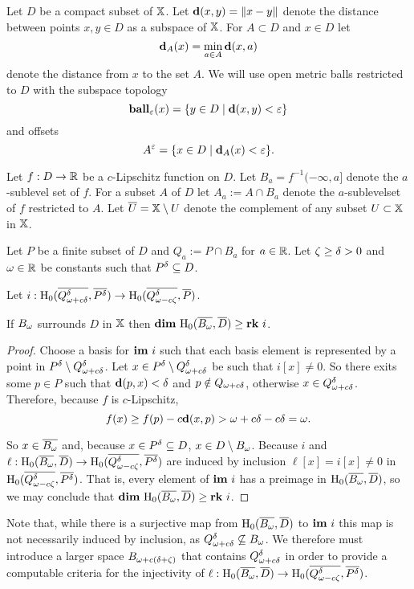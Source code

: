 
Let $D$ be a compact subset of $\mathbb{X}$.
Let $\mathbf{d}(x, y) = \|x - y\|$ denote the distance between points $x,y\in D$ as a subspace of $\mathbb{X}$.
For $A\subset D$ and $x\in D$ let
\[\mathbf{d}_A(x) = \min_{a\in A}\mathbf{d}(x, a)\]
denote the distance from $x$ to the set $A$.
We will use open metric balls restricted to $D$ with the subspace topology
\[\mathbf{ball}_\varepsilon(x) = \{y\in D\mid \mathbf{d}(x, y) < \varepsilon\}\]
and offsets
\[A^\varepsilon = \{x\in D\mid \mathbf{d}_A(x) < \varepsilon\}.\]

Let $f : D\to \mathbb{R}$ be a $c$-Lipschitz function on $D$.
Let $B_a = f^{-1}(-\infty, a]$ denote the $a$-sublevel set of $f$.
For a subset $A$ of $D$ let $A_a := A\cap B_a$ denote the $a$-sublevelset of $f$ restricted to $A$.
Let $\overline{U} = \mathbb{X}\setminus U$ denote the complement of any subset $U\subset \mathbb{X}$ in $\mathbb{X}$.

Let $P$ be a finite subset of $D$ and $Q_a := P\cap B_a$ for $a\in\mathbb{R}$.
Let $\zeta\geq{\delta} > 0 $ and $\omega\in \mathbb{R}$ be constants such that $P^{\delta}\subseteq D$.

\begin{lemma}\label{lem:psurj}
  Let $i : \mathrm{H}_0(\overline{Q_{\omega + c{\delta}}^{\delta}}, \overline{P^{\delta}})\to \mathrm{H}_0(\overline{Q_{\omega - c\zeta}^{\delta}}, \overline{P})$.

  If $B_{\omega}$ surrounds $D$ in $\mathbb{X}$ then $\mathbf{dim}~\mathrm{H}_0(\overline{B_{\omega}}, \overline{D})\geq \mathbf{rk}~i$.
\end{lemma}
\begin{proof}
  Choose a basis for $\mathbf{im}~i$ such that each basis element is represented by a point in $P^{\delta}\setminus Q_{\omega + c{\delta}}^{\delta}$.
  Let $x\in P^{\delta}\setminus Q_{\omega + c{\delta}}^{\delta}$ be such that $i[x] \neq 0$.
  So there exits some $p\in P$ such that $\mathbf{d}(p, x) < \delta$ and $p\notin Q_{\omega + c{\delta}}$, otherwise $x\in Q_{\omega + c{\delta}}^{\delta}$.
  Therefore, because $f$ is $c$-Lipschitz,
  \[ f(x)\geq f(p) - c\mathbf{d}(x, p) > \omega + c{\delta} - c{\delta} =\omega.\]

  So $x\in\overline{B_{\omega}}$ and, because $x\in P^{\delta}\subseteq D$, $x\in D\setminus B_{\omega}$.
  Because $i$ and $\ell : \mathrm{H}_0(\overline{B_{\omega}}, \overline{D})\to \mathrm{H}_0(\overline{Q_{\omega - c\zeta}^{\delta}}, \overline{P^{\delta}})$ are induced by inclusion $\ell[x] = i[x]\neq 0$ in $\mathrm{H}_0(\overline{Q_{\omega - c\zeta}^{\delta}}, \overline{P^{\delta}})$.
  That is, every element of $\mathbf{im}~i$ has a preimage in $\mathrm{H}_0(\overline{B_{\omega}}, \overline{D})$, so we may conclude that $\mathbf{dim}~\mathrm{H}_0(\overline{B_{\omega}}, \overline{D})\geq \mathbf{rk}~i$.
\end{proof}

Note that, while there is a surjective map from $\mathrm{H}_0(\overline{B_{\omega}}, \overline{D})$ to $\mathbf{im}~i$ this map is not necessarily induced by inclusion, as $Q_{\omega + c{\delta}}^{\delta}\not\subseteq B_{\omega}$.
We therefore must introduce a larger space $B_{\omega + c(\delta+\zeta)}$ that contains $Q_{\omega + c{\delta}}^{\delta}$ in order to provide a computable criteria for the injectivity of $\ell : \mathrm{H}_0(\overline{B_{\omega}}, \overline{D})\to\mathrm{H}_0(\overline{Q_{\omega - c\zeta}^{\delta}}, \overline{P^{\delta}})$.

